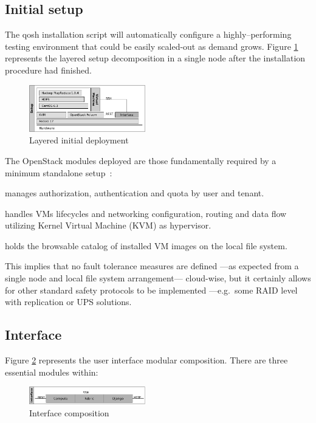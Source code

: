 \documentclass[conference]{IEEEtran}
\begin{document}
\subsection{Initial setup}

\noindent The qosh installation script will automatically configure a highly--performing testing environment that could be easily scaled-out as demand grows. Figure \ref{fig:initial} represents the layered setup decomposition in a single node after the installation procedure had finished.

\begin{figure}[htp]
\centering
\includegraphics[width=0.45\textwidth]{img/005}
\caption{Layered initial deployment}
\label{fig:initial}
\end{figure}

The OpenStack modules deployed are those fundamentally required by a minimum standalone setup~\cite{openstack:2013:online}:

\begin{description}
 \item[Keystone] manages authorization, authentication and quota by user and tenant.
 \item[Nova] handles VMs lifecycles and networking configuration, routing and data flow utilizing Kernel Virtual Machine (KVM) as hypervisor.
 \item[Glance] holds the browsable catalog of installed VM images on the local file system.
\end{description}

This implies that no fault tolerance measures are defined ---as expected from a single node and local file system arrangement--- cloud-wise, but it certainly allows for other standard safety protocols to be implemented ---e.g.\ some RAID level with replication or UPS solutions.


\subsection{Interface}
\noindent Figure \ref{fig:interface} represents the user interface modular composition. There are three essential modules within:

\begin{figure}[tp]
\centering
\includegraphics[width=0.45\textwidth]{img/003}
\caption{Interface composition}
\label{fig:interface}
\end{figure}
\end{document}
